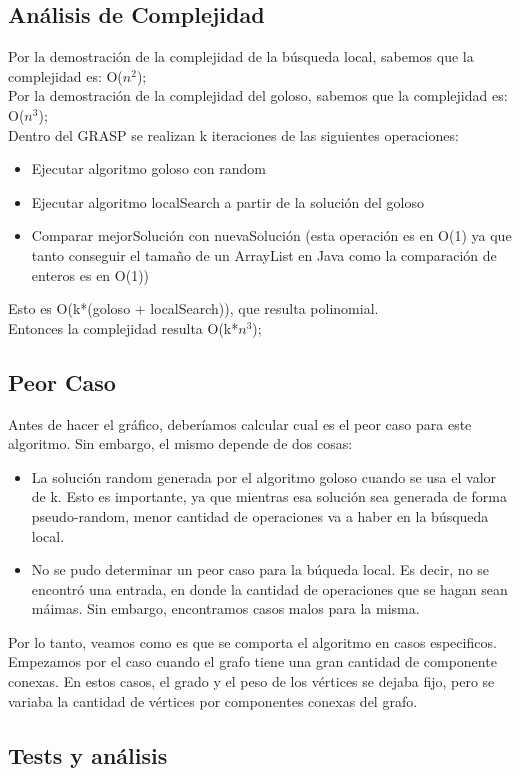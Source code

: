\subsection{Análisis de Complejidad}
Por la demostración de la complejidad de la búsqueda local, sabemos que la complejidad es: O($n^2$);\\
Por la demostración de la complejidad del goloso, sabemos que la complejidad es: O($n^3$);\\
Dentro del GRASP se realizan k iteraciones de las siguientes operaciones:
\begin{itemize}
\item Ejecutar algoritmo goloso con random
\item Ejecutar algoritmo localSearch a partir de la solución del goloso
\item Comparar mejorSolución con nuevaSolución (esta operación es en O(1) ya que tanto conseguir el tamaño de un ArrayList en Java como la comparación de enteros es en O(1)) 
\end{itemize}
Esto es O(k*(goloso + localSearch)), que resulta polinomial.\\
Entonces la complejidad resulta O(k*$n^3$);

\subsection{Peor Caso}
Antes de hacer el gráfico, deberíamos calcular cual es el peor caso para este algoritmo. Sin embargo, el mismo depende de dos cosas:
\begin{itemize}
\item La solución random generada por el algoritmo goloso cuando se usa el valor de k. 	Esto es importante, ya que mientras esa solución sea generada de forma pseudo-random, menor cantidad
	de operaciones va a haber en la búsqueda local.
\item No se pudo determinar un peor caso para la búqueda local. Es decir, no se encontró una entrada, en donde la
	cantidad de operaciones que se hagan sean máimas. Sin embargo, encontramos casos malos para la misma.
\end{itemize}
Por lo tanto, veamos como es que se comporta el algoritmo en casos especificos. Empezamos por el caso cuando el
grafo tiene una gran cantidad de componente conexas. En estos casos, el grado y el peso de los vértices se dejaba fijo,
pero se variaba la cantidad de vértices por componentes conexas del grafo.

\subsection{Tests y análisis}


